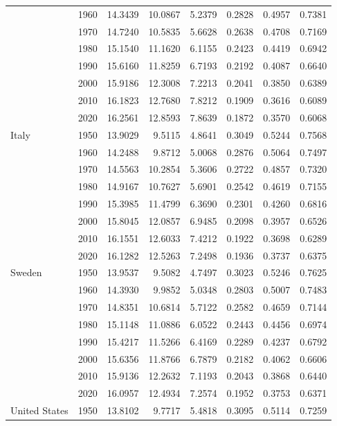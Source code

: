 \begin{table}[h]
\begin{tabular*}{\textwidth}{@{\extracolsep{\fill}}llrrrrrr}
 & 1960 & 14.3439 & 10.0867 & 5.2379 & 0.2828 & 0.4957 & 0.7381\\
 & 1970 & 14.7240 & 10.5835 & 5.6628 & 0.2638 & 0.4708 & 0.7169\\
 & 1980 & 15.1540 & 11.1620 & 6.1155 & 0.2423 & 0.4419 & 0.6942\\
 & 1990 & 15.6160 & 11.8259 & 6.7193 & 0.2192 & 0.4087 & 0.6640\\
 & 2000 & 15.9186 & 12.3008 & 7.2213 & 0.2041 & 0.3850 & 0.6389\\
 & 2010 & 16.1823 & 12.7680 & 7.8212 & 0.1909 & 0.3616 & 0.6089\\
 & 2020 & 16.2561 & 12.8593 & 7.8639 & 0.1872 & 0.3570 & 0.6068\\
\addlinespace[2pt]
Italy & 1950 & 13.9029 & 9.5115 & 4.8641 & 0.3049 & 0.5244 & 0.7568\\
 & 1960 & 14.2488 & 9.8712 & 5.0068 & 0.2876 & 0.5064 & 0.7497\\
 & 1970 & 14.5563 & 10.2854 & 5.3606 & 0.2722 & 0.4857 & 0.7320\\
 & 1980 & 14.9167 & 10.7627 & 5.6901 & 0.2542 & 0.4619 & 0.7155\\
 & 1990 & 15.3985 & 11.4799 & 6.3690 & 0.2301 & 0.4260 & 0.6816\\
 & 2000 & 15.8045 & 12.0857 & 6.9485 & 0.2098 & 0.3957 & 0.6526\\
 & 2010 & 16.1551 & 12.6033 & 7.4212 & 0.1922 & 0.3698 & 0.6289\\
 & 2020 & 16.1282 & 12.5263 & 7.2498 & 0.1936 & 0.3737 & 0.6375\\
\addlinespace[2pt]
Sweden & 1950 & 13.9537 & 9.5082 & 4.7497 & 0.3023 & 0.5246 & 0.7625\\
 & 1960 & 14.3930 & 9.9852 & 5.0348 & 0.2803 & 0.5007 & 0.7483\\
 & 1970 & 14.8351 & 10.6814 & 5.7122 & 0.2582 & 0.4659 & 0.7144\\
 & 1980 & 15.1148 & 11.0886 & 6.0522 & 0.2443 & 0.4456 & 0.6974\\
 & 1990 & 15.4217 & 11.5266 & 6.4169 & 0.2289 & 0.4237 & 0.6792\\
 & 2000 & 15.6356 & 11.8766 & 6.7879 & 0.2182 & 0.4062 & 0.6606\\
 & 2010 & 15.9136 & 12.2632 & 7.1193 & 0.2043 & 0.3868 & 0.6440\\
 & 2020 & 16.0957 & 12.4934 & 7.2574 & 0.1952 & 0.3753 & 0.6371\\
\addlinespace[2pt]
United States & 1950 & 13.8102 & 9.7717 & 5.4818 & 0.3095 & 0.5114 & 0.7259\\

\end{tabular*}
\end{table}
